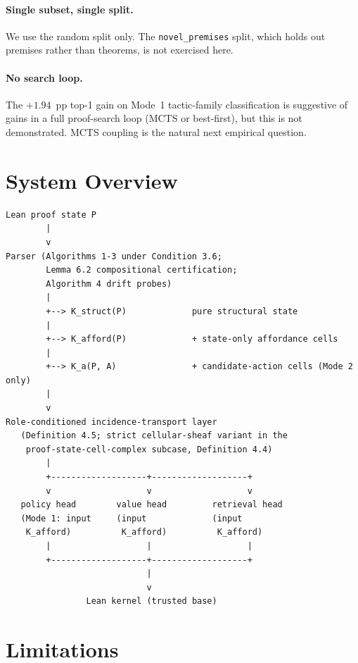 \documentclass[11pt]{article}
\theoremstyle{definition}
\theoremstyle{plain}
\begin{document}
\paragraph{Single subset, single split.}
We use the random split only. The \texttt{novel\_premises} split, which
holds out premises rather than theorems, is not exercised here.

\paragraph{No search loop.}
The $+1.94$~pp top-1 gain on Mode~1 tactic-family classification is
suggestive of gains in a full proof-search loop (MCTS or best-first), but
this is not demonstrated. MCTS coupling is the natural next empirical
question.

\section{System Overview}\label{sec:system}

\begin{small}
\begin{verbatim}
Lean proof state P
        |
        v
Parser (Algorithms 1-3 under Condition 3.6;
        Lemma 6.2 compositional certification;
        Algorithm 4 drift probes)
        |
        +--> K_struct(P)             pure structural state
        |
        +--> K_afford(P)             + state-only affordance cells
        |
        +--> K_a(P, A)               + candidate-action cells (Mode 2 only)
        |
        v
Role-conditioned incidence-transport layer
   (Definition 4.5; strict cellular-sheaf variant in the
    proof-state-cell-complex subcase, Definition 4.4)
        |
        +-------------------+-------------------+
        v                   v                   v
   policy head        value head         retrieval head
   (Mode 1: input     (input             (input
    K_afford)          K_afford)          K_afford)
        |                   |                   |
        +-------------------+-------------------+
                            |
                            v
                Lean kernel (trusted base)
\end{verbatim}
\end{small}

\section{Limitations}\label{sec:limitations}
\end{document}
